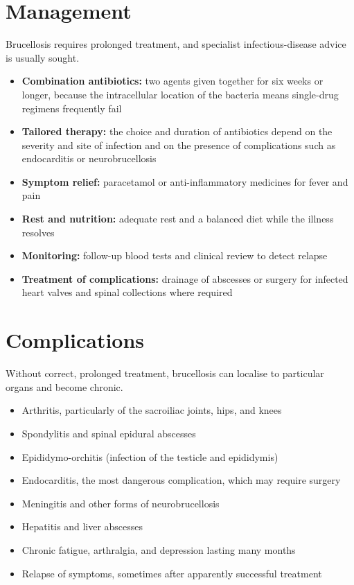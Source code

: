 \section*{Management}
Brucellosis requires prolonged treatment, and specialist infectious-disease advice is usually sought.

\begin{itemize}
    \item \textbf{Combination antibiotics:} two agents given together for six weeks or longer, because the intracellular location of the bacteria means single-drug regimens frequently fail
    \item \textbf{Tailored therapy:} the choice and duration of antibiotics depend on the severity and site of infection and on the presence of complications such as endocarditis or neurobrucellosis
    \item \textbf{Symptom relief:} paracetamol or anti-inflammatory medicines for fever and pain
    \item \textbf{Rest and nutrition:} adequate rest and a balanced diet while the illness resolves
    \item \textbf{Monitoring:} follow-up blood tests and clinical review to detect relapse
    \item \textbf{Treatment of complications:} drainage of abscesses or surgery for infected heart valves and spinal collections where required
\end{itemize}

\section*{Complications}
Without correct, prolonged treatment, brucellosis can localise to particular organs and become chronic.

\begin{itemize}
    \item Arthritis, particularly of the sacroiliac joints, hips, and knees
    \item Spondylitis and spinal epidural abscesses
    \item Epididymo-orchitis (infection of the testicle and epididymis)
    \item Endocarditis, the most dangerous complication, which may require surgery
    \item Meningitis and other forms of neurobrucellosis
    \item Hepatitis and liver abscesses
    \item Chronic fatigue, arthralgia, and depression lasting many months
    \item Relapse of symptoms, sometimes after apparently successful treatment
\end{itemize}

